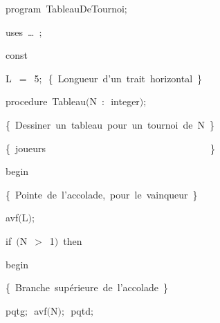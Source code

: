 
{
\parindent {}
\medskip

\carrenoir
\vspace{\neglskip}\mbox{\blc  \idt  \mcl program\idt\ TableauDeTournoi$;$
}\par 
\vspace{\neglskip}\mbox{\blc \blk\idt \mcl uses\idt \ \ldots\ $;$
}\par 
\medskip

\pagebreak[3] 
\vspace{\neglskip}\mbox{\blc  \blk\idt  \mcl const\idt }\par 
\vspace{\neglskip}\mbox{\blc  \blk\blk\idt  L\ $=$\ 5$;$\ \cmt  \{\ Longueur\ d{'}un\ trait\ horizontal\ \}\idt }\par 
\medskip

\pagebreak[3] 
\vspace{\neglskip}\mbox{\blc  \blk\idt  \mcl procedure\idt \ Tableau$($N\ $:$\ integer$)$$;$}\par 
\vspace{\neglskip}\mbox{\blc  \blk\blk\idt  \cmt  \{\ Dessiner\ un\ tableau\ pour\ un\ tournoi\ de\ N\ \}\idt }\par 
\vspace{\neglskip}\mbox{\blc  \blk\blk\idt  \cmt  \{\ joueurs\ \ \ \ \ \ \ \ \ \ \ \ \ \ \ \ \ \ \ \ \ \ \ \ \ \ \ \ \ \ \ \ \ \ \}\idt }\par 
\vspace{\neglskip}\mbox{\blc  \blk\idt  \mcl begin\idt }\par 
\vspace{\neglskip}\mbox{\blc  \blk\blk\idt  \cmt  \{\ Pointe\ de\ l{'}accolade,\ pour\ le\ vainqueur\ \}\idt }\par 
\vspace{\neglskip}\mbox{\blc  \blk\blk\idt  avf$($L$)$$;$\ }\par 
\pagebreak[3] 
\vspace{\neglskip}\mbox{\blc  \blk\blk\idt  \mcl if\idt \ $($N\ $>$\ 1$)$\ \mcl then\idt }\par 
\vspace{\neglskip}\mbox{\blc  \blk\blk\blk\idt  \mcl begin\idt }\par 
\vspace{\neglskip}\mbox{\blc  \blk\blk\blk\blk\blk\idt  \cmt  \{\ Branche\ supérieure\ de\ l{'}accolade\ \}\idt }\par 
\vspace{\neglskip}\mbox{\blc  \blk\blk\blk\blk\blk\idt  pqtg$;$\ avf$($N$)$$;$\ pqtd$;$}\par 
}
